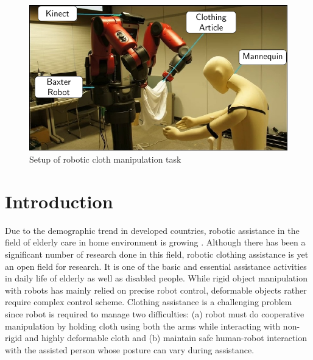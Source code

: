 \documentclass[sigconf]{acmart}
\begin{document}


\maketitle

\begin{figure}
	\includegraphics[width=\linewidth]{setup}
	\caption{Setup of robotic cloth manipulation task}
	\label{fig:setup}
\end{figure}

\section{Introduction}
\label{sec:introduction}
Due to the demographic trend in developed countries, robotic assistance in the field of elderly care in home environment is growing \cite{broekens2009assistive}. Although there has been a significant number of research done in this field, robotic clothing assistance is yet an open field for research. It is one of the basic and essential assistance activities in daily life of elderly as well as disabled people. While rigid object manipulation with robots has mainly relied on precise robot control, deformable objects rather require complex control scheme. Clothing assistance is a challenging problem since robot is required to manage two difficulties: (a) robot must do cooperative manipulation by holding cloth using both the arms while interacting with non-rigid and highly deformable cloth and (b) maintain safe human-robot interaction with the assisted person whose posture can vary during assistance.
\end{document}

